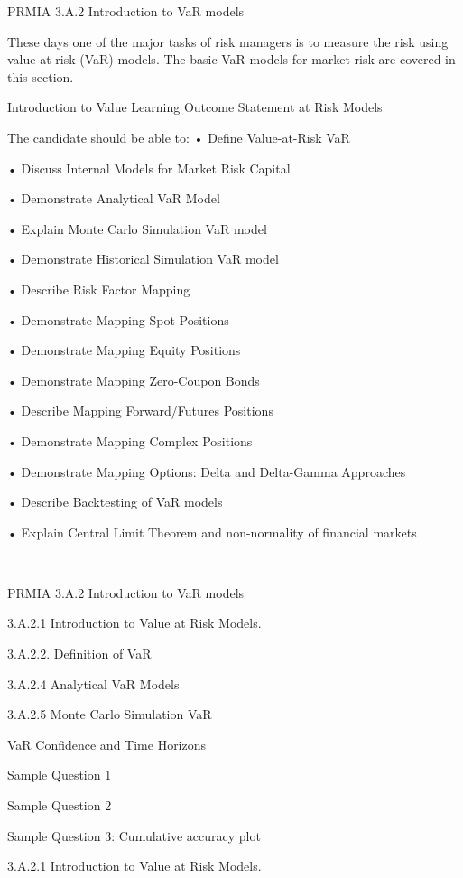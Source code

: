 
 
PRMIA 3.A.2 Introduction to VaR models

These days one of the major tasks of risk managers is to measure the risk using value-at-risk (VaR) models. The basic VaR models for market risk are covered in this section.


Introduction to Value Learning Outcome Statement at Risk Models

The candidate should be able to:
•
 Define Value-at-Risk VaR

•
 Discuss Internal Models for Market Risk Capital

•
 Demonstrate Analytical VaR Model

•
 Explain Monte Carlo Simulation VaR model

•
 Demonstrate Historical Simulation VaR model

•
 Describe Risk Factor Mapping

•
 Demonstrate Mapping Spot Positions

•
 Demonstrate Mapping Equity Positions

•
 Demonstrate Mapping Zero-Coupon Bonds

•
 Describe Mapping Forward/Futures Positions

•
 Demonstrate Mapping Complex Positions

•
 Demonstrate Mapping Options: Delta and Delta-Gamma Approaches

•
 Describe Backtesting of VaR models

•
 Explain Central Limit Theorem and non-normality of financial markets




PRMIA 3.A.2 Introduction to VaR models

3.A.2.1 Introduction to Value at Risk Models.

3.A.2.2. Definition of VaR

3.A.2.4 Analytical VaR Models

3.A.2.5 Monte Carlo Simulation VaR

VaR Confidence and Time Horizons

Sample Question 1

Sample Question 2

Sample Question 3: Cumulative accuracy plot


3.A.2.1 Introduction to Value at Risk Models.

